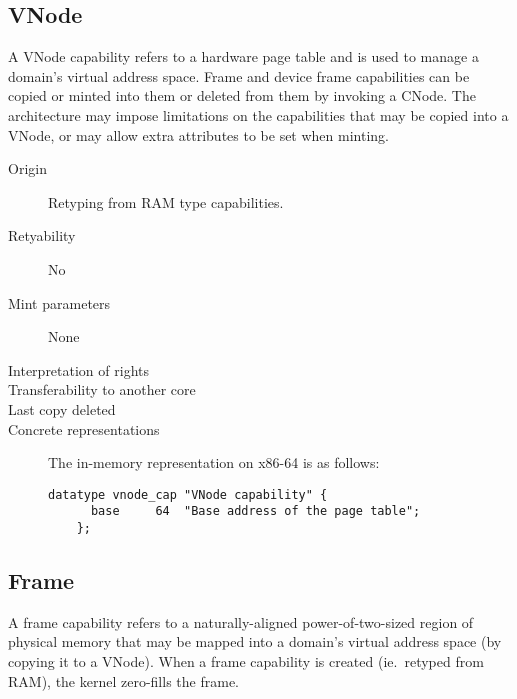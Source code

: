 \subsection{VNode}
A VNode capability refers to a hardware page table and is used to
manage a domain's virtual address space.  Frame and device frame
capabilities can be copied or minted into them or deleted from them by
invoking a CNode.  The architecture may impose limitations on the
capabilities that may be copied into a VNode, or may allow extra
attributes to be set when minting.

\begin{description}
\item[Origin] Retyping from RAM type capabilities.

\item[Retyability] No

\item[Mint parameters] None
  
\item[Interpretation of rights] 
  
\item[Transferability to another core] 

\item[Last copy deleted] 
  
\item[Concrete representations] The in-memory representation on x86-64
  is as follows:
  
  \begin{lstlisting}[language=Mackerel]
    datatype vnode_cap "VNode capability" {
      base     64  "Base address of the page table";
    };
  \end{lstlisting}
\end{description}  

\subsection{Frame}
A frame capability refers to a naturally-aligned power-of-two-sized
region of physical memory that may be mapped into a domain's virtual
address space (by copying it to a VNode).  When a frame capability is
created (ie.~retyped from RAM), the kernel zero-fills the frame.

